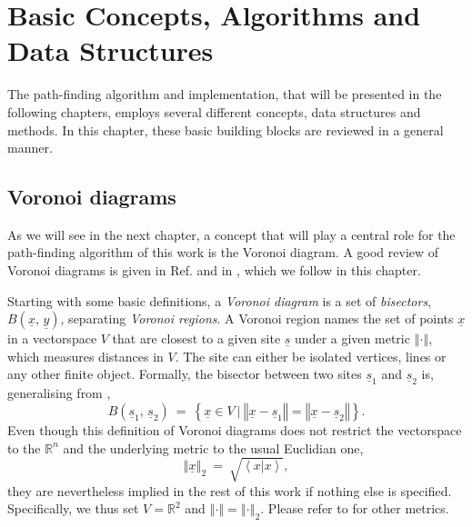%
%

\chapter{Basic Concepts, Algorithms and Data Structures}
\label{ch:algos}
The  path-finding algorithm and implementation, that will be presented in the following chapters,
employs several different concepts, data structures and methods.
In this chapter, these basic building blocks are reviewed in a general manner.


\section{Voronoi diagrams}
\label{sec:voro}
As we will see in the next chapter, a concept that will play a central role for the path-finding 
algorithm of this work is the Voronoi diagram.
A good review of Voronoi diagrams is given in Ref. \cite[Ch. 7, pp. 147-171]{Berg2008} 
and in \cite[Ch. 5, pp. 209f]{FUH_geo2020}, which we follow in this chapter.

Starting with some basic definitions, a \textit{Voronoi diagram} is a set of 
\textit{bisectors}, $B\left(\underline{x},\, \underline{y}\right)$, separating \textit{Voronoi regions}.
A Voronoi region names the set of points $\underline{x}$ in a vectorspace $V$ that are closest to 
a given site $\underline{s}$ under a given metric $\left\Vert \cdot \right\Vert$, which measures distances in $V$.
The site can either be isolated vertices, lines or any other finite object.
Formally, the bisector between two sites $\underline{s}_1$ and $\underline{s}_2$ is, 
generalising from \cite[p. 140]{Icking2001},
\begin{equation}
	B\left(\underline{s}_1,\, \underline{s}_2\right)\ =\ \left\{ \underline{x} \in V \ |\ 
		\left\Vert \underline{x} - \underline{s}_1 \right\Vert = \left\Vert \underline{x} - \underline{s}_2 \right\Vert \right\}.
\end{equation}
Even though this definition of Voronoi diagrams does not restrict the vectorspace to the $\mathbb{R}^n$ 
and the underlying metric to the usual Euclidian one, 
\begin{equation}
	\left\Vert \underline{x} \right\Vert_2 \ =\ \sqrt{\left<x | x \right>},
\end{equation}
they are nevertheless implied in the rest of this work if nothing else is specified.
Specifically, we thus set $V = \mathbb{R}^2$ and $\left\Vert \cdot \right\Vert = \left\Vert \cdot \right\Vert_2$. 
Please refer to \cite{Icking2001} for other metrics.




